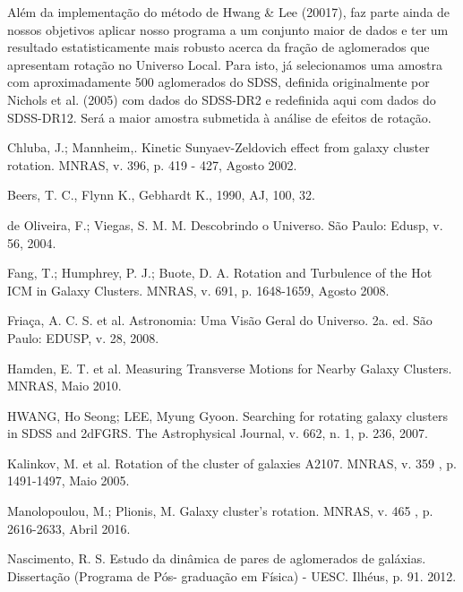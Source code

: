 \documentclass[12pt,fleqn]{article}
\begin{document}
{Além da implementação do método de Hwang \& Lee (20017), 
faz parte ainda de nossos objetivos aplicar nosso programa a um conjunto maior de dados
e ter um resultado estatisticamente mais robusto acerca da fração de aglomerados
que apresentam rotação no Universo Local. Para isto, já selecionamos uma amostra
com aproximadamente 500 aglomerados do SDSS, definida originalmente por Nichols et al. (2005)
com dados do SDSS-DR2 e redefinida aqui com dados do SDSS-DR12. Será a maior amostra submetida
à análise de efeitos de rotação.


\newpage
\begin{thebibliography}{99}
\fontsize{11}{0}\selectfont
{}
Chluba, J.; Mannheim,. Kinetic Sunyaev-Zeldovich effect from galaxy cluster rotation. MNRAS, v. 396, p. 419 -
427, Agosto 2002.

Beers, T. C., Flynn K., Gebhardt K., 1990, AJ, 100, 32. 

de Oliveira, F.; Viegas, S. M. M. Descobrindo o Universo. São Paulo: Edusp, v. 56, 2004.

Fang, T.; Humphrey, P. J.; Buote, D. A. Rotation and Turbulence of the Hot ICM in Galaxy Clusters. MNRAS,
v. 691, p. 1648-1659, Agosto 2008.

Friaça, A. C. S. et al. Astronomia: Uma Visão Geral do Universo. 2a. ed. São Paulo: EDUSP, v. 28, 2008.

Hamden, E. T. et al. Measuring Transverse Motions for Nearby Galaxy Clusters. MNRAS, Maio 2010.

HWANG, Ho Seong; LEE, Myung Gyoon. Searching for rotating galaxy clusters in SDSS and 2dFGRS. {The Astrophysical Journal}, v. 662, n. 1, p. 236, 2007.

Kalinkov, M. et al. Rotation of the cluster of galaxies A2107. MNRAS, v. 359 , p. 1491-1497, Maio 2005.

Manolopoulou, M.; Plionis, M. Galaxy cluster's rotation. MNRAS, v. 465 , p. 2616-2633, Abril 2016.

Nascimento, R. S. Estudo da dinâmica de pares de aglomerados de galáxias. Dissertação (Programa de Pós-
graduação em Física) - UESC. Ilhéus, p. 91. 2012.


\end{thebibliography}}
\end{document}
